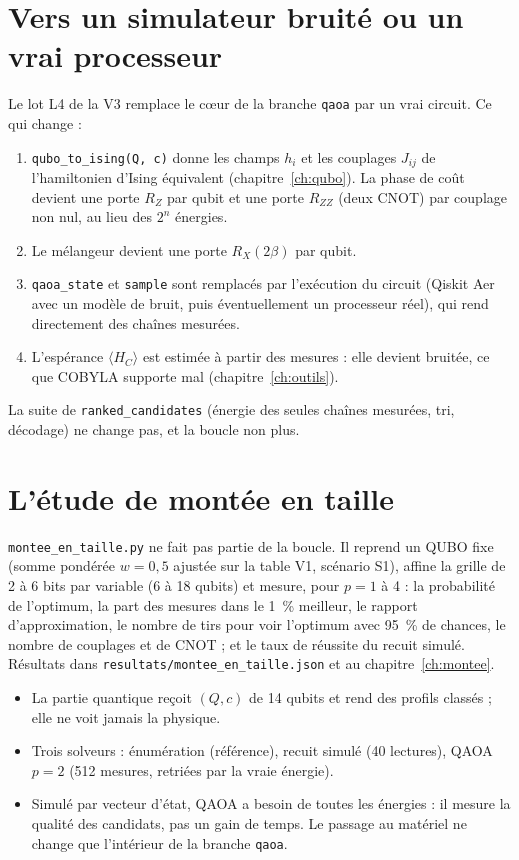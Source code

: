 \section{Vers un simulateur bruité ou un vrai processeur}\label{sec:materiel-v3}
Le lot L4 de la V3 remplace le cœur de la branche \texttt{qaoa} par un vrai circuit. Ce qui change :
\begin{enumerate}
\item \texttt{qubo\_to\_ising(Q, c)} donne les champs $h_i$ et les couplages $J_{ij}$ de l'hamiltonien d'Ising équivalent (chapitre~\ref{ch:qubo}). La phase de coût devient une porte $R_Z$ par qubit et une porte $R_{ZZ}$ (deux CNOT) par couplage non nul, au lieu des $2^n$ énergies.
\item Le mélangeur devient une porte $R_X(2\beta)$ par qubit.
\item \texttt{qaoa\_state} et \texttt{sample} sont remplacés par l'exécution du circuit (Qiskit Aer avec un modèle de bruit, puis éventuellement un processeur réel), qui rend directement des chaînes mesurées.
\item L'espérance $\langle H_C\rangle$ est estimée à partir des mesures : elle devient bruitée, ce que COBYLA supporte mal (chapitre~\ref{ch:outils}).
\end{enumerate}
La suite de \texttt{ranked\_candidates} (énergie des seules chaînes mesurées, tri, décodage) ne change pas, et la boucle non plus.

\section{L'étude de montée en taille}
\texttt{montee\_en\_taille.py} ne fait pas partie de la boucle. Il reprend un QUBO fixe (somme pondérée $w=0{,}5$ ajustée sur la table V1, scénario S1), affine la grille de 2 à 6 bits par variable (6 à 18 qubits) et mesure, pour $p=1$ à 4 : la probabilité de l'optimum, la part des mesures dans le 1~\% meilleur, le rapport d'approximation, le nombre de tirs pour voir l'optimum avec 95~\% de chances, le nombre de couplages et de CNOT ; et le taux de réussite du recuit simulé. Résultats dans \texttt{resultats/montee\_en\_taille.json} et au chapitre~\ref{ch:montee}.

\begin{resultat}
\begin{itemize}
\item La partie quantique reçoit $(Q,c)$ de 14 qubits et rend des profils classés ; elle ne voit jamais la physique.
\item Trois solveurs : énumération (référence), recuit simulé (40 lectures), QAOA $p=2$ (512 mesures, retriées par la vraie énergie).
\item Simulé par vecteur d'état, QAOA a besoin de toutes les énergies : il mesure la qualité des candidats, pas un gain de temps. Le passage au matériel ne change que l'intérieur de la branche \texttt{qaoa}.
\end{itemize}
\end{resultat}

